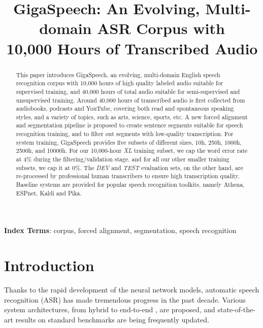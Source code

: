 \documentclass[a4paper]{article}
\title{GigaSpeech: An Evolving, Multi-domain ASR Corpus with \\10,000 Hours of Transcribed Audio}
\begin{document}
\eightpt
\maketitle
\begin{abstract}
This paper introduces GigaSpeech, an evolving, multi-domain English speech recognition
  corpus with 10,000 hours of high quality labeled audio suitable for supervised training,
  and 40,000 hours of total audio suitable for semi-supervised and unsupervised training.
  Around 40,000 hours of transcribed audio is first collected from audiobooks, podcasts and
  YouTube, covering both read and spontaneous speaking styles, and a variety of
  topics, such as arts, science, sports, etc. A new forced alignment and segmentation pipeline is proposed
  to create sentence segments suitable for speech recognition training, and to
  filter out segments with low-quality transcription. For system training, GigaSpeech provides five subsets of different sizes, 10h, 250h, 1000h, 2500h, and 10000h. For our 10,000-hour
  {\it XL} training subset, we cap the word error rate at 4\% during the
  filtering/validation stage, and for all our other smaller training subsets,
  we cap it at 0\%. The {\it DEV} and {\it TEST} evaluation sets, on the other
  hand, are re-processed by professional human transcribers to ensure high
  transcription quality. Baseline systems are provided for popular speech
  recognition toolkits, namely Athena, ESPnet, Kaldi and Pika.
\end{abstract}

\noindent\textbf{Index Terms}: corpus, forced alignment, segmentation,
speech recognition

\section{Introduction}
Thanks to the rapid development of the neural network models, automatic speech recognition (ASR)
has made tremendous progress in the past decade. Various system architectures,
from hybrid \cite{dahl2011context} to end-to-end \cite{graves2014towards}, are
proposed, and state-of-the-art results on standard benchmarks are being
frequently updated.
\end{document}
